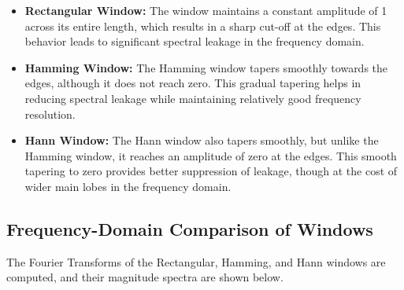 \documentclass[10pt]{article}
\theoremstyle{definition}
\theoremstyle{remark}
\theoremstyle{definition}
\numberwithin{equation}{prob}
\begin{document}
\begin{itemize}
    \item \textbf{Rectangular Window:} The window maintains a constant amplitude of 1 across its entire length, which results in a sharp cut-off at the edges. This behavior leads to significant spectral leakage in the frequency domain.
    
    \item \textbf{Hamming Window:} The Hamming window tapers smoothly towards the edges, although it does not reach zero. This gradual tapering helps in reducing spectral leakage while maintaining relatively good frequency resolution.
    
    \item \textbf{Hann Window:} The Hann window also tapers smoothly, but unlike the Hamming window, it reaches an amplitude of zero at the edges. This smooth tapering to zero provides better suppression of leakage, though at the cost of wider main lobes in the frequency domain.
\end{itemize}


\subsection{Frequency-Domain Comparison of Windows}
The Fourier Transforms of the Rectangular, Hamming, and Hann windows are computed, and their magnitude spectra are shown below.
\end{document}
